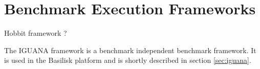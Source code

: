 \section{Benchmark Execution Frameworks}
Hobbit framework ? 

The IGUANA framework is a benchmark independent benchmark framework.
It is used in the Basilisk platform and is shortly described in section \ref{sec:iguana}.

